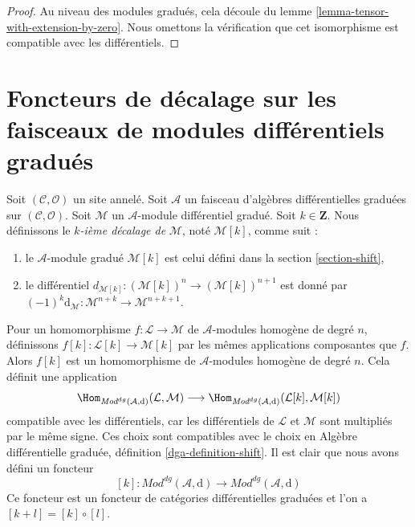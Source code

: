 \begin{proof} Au
niveau des modules gradués, cela découle
du lemme \ref{lemma-tensor-with-extension-by-zero}.
Nous omettons la vérification que cet isomorphisme
est compatible avec les différentiels.
\end{proof}








\section{Foncteurs de décalage sur les faisceaux de modules différentiels gradués}
\label{section-shift-dg}

\noindent
Soit $(\mathcal{C}, \mathcal{O})$ un site annelé. Soit
$\mathcal{A}$ un faisceau d'algèbres différentielles graduées
sur $(\mathcal{C}, \mathcal{O})$.
Soit $\mathcal{M}$ un $\mathcal{A}$-module différentiel gradué.
Soit $k \in \mathbf{Z}$. Nous définissons le {\it $k$-ième décalage de} $\mathcal{M}$,
noté $\mathcal{M}[k]$, comme
suit : \begin{enumerate}
\item le $\mathcal{A}$-module gradué $\mathcal{M}[k]$ est
celui défini dans la section \ref{section-shift},
\item le différentiel
$d_{\mathcal{M}[k]} : (\mathcal{M}[k])^n \to (\mathcal{M}[k])^{n + 1}$
est donné par
$(-1)^k\text{d}_\mathcal{M} : \mathcal{M}^{n + k} \to \mathcal{M}^{n + k + 1}$.
\end{enumerate} Pour
un homomorphisme $f : \mathcal{L} \to \mathcal{M}$ de $\mathcal{A}$-modules homogène
de degré $n$, définissons $f[k] : \mathcal{L}[k] \to \mathcal{M}[k]$ par les
mêmes applications composantes que $f$. Alors $f[k]$ est
un homomorphisme de $\mathcal{A}$-modules homogène de degré $n$.
Cela définit
une application $$
\Hom_{\textit{Mod}^{dg}(\mathcal{A}, \text{d})}(\mathcal{L}, \mathcal{M})
\longrightarrow
\Hom_{\textit{Mod}^{dg}(\mathcal{A}, \text{d})}
(\mathcal{L}[k], \mathcal{M}[k])
$$
compatible avec les différentiels, car les
différentiels de $\mathcal{L}$ et
$\mathcal{M}$ sont multipliés par le même signe. Ces choix sont compatibles avec le choix
en Algèbre différentielle graduée,
définition \ref{dga-definition-shift}. Il est clair que nous avons
défini un foncteur
$$ [k]
:
\textit{Mod}^{dg}(\mathcal{A}, \text{d})
\longrightarrow
\textit{Mod}^{dg}(\mathcal{A}, \text{d})
$$ Ce foncteur est un foncteur
de catégories différentielles graduées et l'on a
$[k + l] = [k] \circ [l]$.

